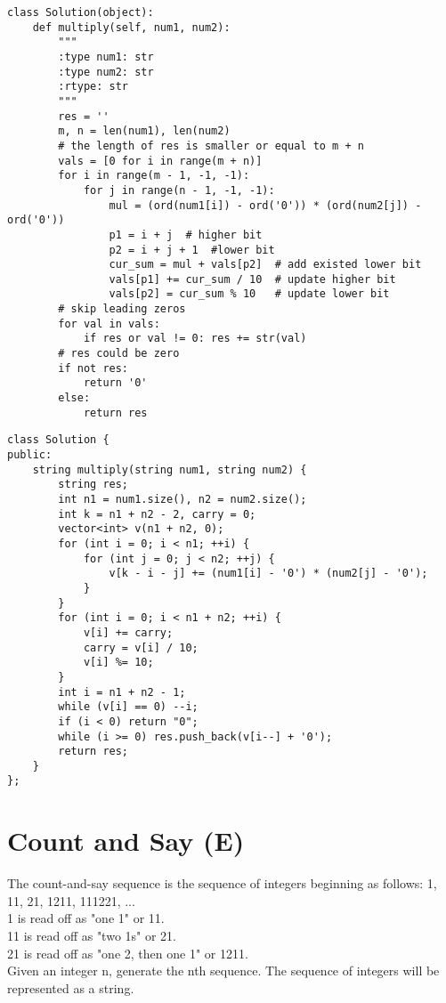 \begin{lstlisting}
class Solution(object):
    def multiply(self, num1, num2):
        """
        :type num1: str
        :type num2: str
        :rtype: str
        """
        res = ''
        m, n = len(num1), len(num2)
        # the length of res is smaller or equal to m + n
        vals = [0 for i in range(m + n)]
        for i in range(m - 1, -1, -1):
            for j in range(n - 1, -1, -1):
                mul = (ord(num1[i]) - ord('0')) * (ord(num2[j]) - ord('0'))
                p1 = i + j  # higher bit
                p2 = i + j + 1  #lower bit
                cur_sum = mul + vals[p2]  # add existed lower bit
                vals[p1] += cur_sum / 10  # update higher bit
                vals[p2] = cur_sum % 10   # update lower bit
        # skip leading zeros
        for val in vals:
            if res or val != 0: res += str(val)
        # res could be zero
        if not res:
            return '0'
        else: 
            return res
\end{lstlisting}

\begin{lstlisting}
class Solution {
public:
    string multiply(string num1, string num2) {
        string res;
        int n1 = num1.size(), n2 = num2.size();
        int k = n1 + n2 - 2, carry = 0;
        vector<int> v(n1 + n2, 0);
        for (int i = 0; i < n1; ++i) {
            for (int j = 0; j < n2; ++j) {
                v[k - i - j] += (num1[i] - '0') * (num2[j] - '0');
            }
        }
        for (int i = 0; i < n1 + n2; ++i) {
            v[i] += carry;
            carry = v[i] / 10;
            v[i] %= 10;
        }
        int i = n1 + n2 - 1;
        while (v[i] == 0) --i;
        if (i < 0) return "0";
        while (i >= 0) res.push_back(v[i--] + '0');
        return res;
    }
};
\end{lstlisting}


\section{Count and Say (E)}
The count-and-say sequence is the sequence of integers beginning as follows: 1, 11, 21, 1211, 111221, ...\\
1 is read off as "one 1" or 11.\\
11 is read off as "two 1s" or 21.\\
21 is read off as "one 2, then one 1" or 1211.\\

Given an integer n, generate the nth sequence. The sequence of integers will be represented as a string. \\


